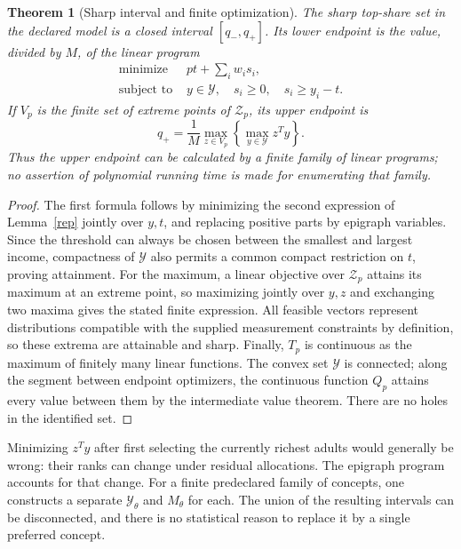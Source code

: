 \documentclass[11pt]{article}
\newtheorem{theorem}{Theorem}
\theoremstyle{remark}\newtheorem{remark}[theorem]{Remark}
\begin{document}
\begin{theorem}[Sharp interval and finite optimization]\label{program}
The sharp top-share set in the declared model is a closed interval $[q_-,q_+]$. Its lower endpoint is the value, divided by $M$, of the linear program
\[
 \begin{split}
 \text{minimize }&pt+\sum_iw_i s_i,\\
 \text{subject to }&y\in\mathcal Y,\quad s_i\geq0,\quad s_i\geq y_i-t.
 \end{split}
\]
If $V_p$ is the finite set of extreme points of $\mathcal Z_p$, its upper endpoint is
\[
 q_+=\frac1M\max_{z\in V_p}\left\{\max_{y\in\mathcal Y}z^Ty\right\}.
\]
Thus the upper endpoint can be calculated by a finite family of linear programs; no assertion of polynomial running time is made for enumerating that family.
\end{theorem}
\begin{proof}
The first formula follows by minimizing the second expression of Lemma~\ref{rep} jointly over $y,t$, and replacing positive parts by epigraph variables. Since the threshold can always be chosen between the smallest and largest income, compactness of $\mathcal Y$ also permits a common compact restriction on $t$, proving attainment. For the maximum, a linear objective over $\mathcal Z_p$ attains its maximum at an extreme point, so maximizing jointly over $y,z$ and exchanging two maxima gives the stated finite expression. All feasible vectors represent distributions compatible with the supplied measurement constraints by definition, so these extrema are attainable and sharp. Finally, $T_p$ is continuous as the maximum of finitely many linear functions. The convex set $\mathcal Y$ is connected; along the segment between endpoint optimizers, the continuous function $Q_p$ attains every value between them by the intermediate value theorem. There are no holes in the identified set.
\end{proof}

Minimizing $z^Ty$ after first selecting the currently richest adults would generally be wrong: their ranks can change under residual allocations. The epigraph program accounts for that change. For a finite predeclared family of concepts, one constructs a separate $\mathcal Y_\theta$ and $M_\theta$ for each. The union of the resulting intervals can be disconnected, and there is no statistical reason to replace it by a single preferred concept.
\end{document}
